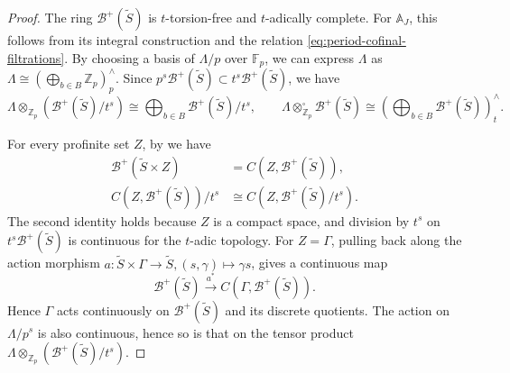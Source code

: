 \documentclass[11pt]{article}
\theoremstyle{definition}
\newcommand{\Zp}{\mathbb Z_p}
\begin{document}
\begin{proof}
The ring \(\mathscr B^+(\widetilde{S})\) is \(t\)-torsion-free and
\(t\)-adically complete.  For \(\mathbb A_J\), this follows from
its integral construction and the relation
\eqref{eq:period-cofinal-filtrations}.
By choosing a basis of $\Lambda/p$ over $\mathbb{F}_p$, we can express $\Lambda$ as \(\Lambda\cong(\bigoplus_{b\in B}\Zp)^\wedge_p\).
Since \(p^s\mathscr B^+(\widetilde{S})\subset
 t^s\mathscr B^+(\widetilde{S})\), we have
\[
 \Lambda\otimes_{\Zp}(\mathscr B^+(\widetilde{S})/t^s)
 \cong\bigoplus_{b\in B}\mathscr B^+(\widetilde{S})/t^s,\qquad
 \Lambda\otimes_{\Zp}^{\square}\mathscr B^+(\widetilde{S})
 \cong\left(\bigoplus_{b\in B}\mathscr B^+(\widetilde{S})\right)^\wedge_t.
\]

For every profinite set \(Z\), by
\cite[Proposition~4.7(i)--(ii) and Corollary~4.10]{BoscoDrinfeld} we have
\begin{align*}
 \mathscr B^+(\widetilde{S}\times Z)
 &=C(Z,\mathscr B^+(\widetilde{S})),\\
 C(Z,\mathscr B^+(\widetilde{S}))/t^s
 &\cong C(Z,\mathscr B^+(\widetilde{S})/t^s).
\end{align*}
The second identity holds because $Z$ is a compact space, and division by \(t^s\)
on \(t^s\mathscr B^+(\widetilde{S})\) is continuous for the
\(t\)-adic topology.
For \(Z=\Gamma\), pulling back along the action morphism $a\colon\widetilde{S}\times\Gamma\to\widetilde{S}, (s,\gamma)\mapsto \gamma s$,
gives a continuous map 
\[
 \mathscr B^+(\widetilde{S})\xrightarrow{a^*}
 C(\Gamma,\mathscr B^+(\widetilde{S})).
\]
Hence $\Gamma$ acts continuously on \(\mathscr B^+(\widetilde{S})\) 
and its discrete quotients.  The action on \(\Lambda/p^s\)
is also continuous, hence so is that on the tensor product
\(\Lambda\otimes_{\Zp}(\mathscr B^+(\widetilde{S})/t^s)\).


\end{proof}
\end{document}
